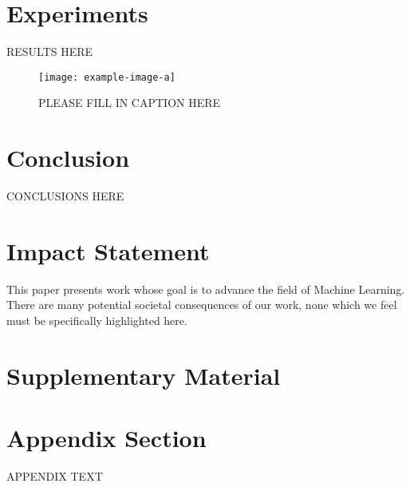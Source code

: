 \documentclass{article}
\theoremstyle{plain}
\theoremstyle{definition}
\theoremstyle{remark}
\begin{document}
\section{Experiments}
\label{sec:experiments}
RESULTS HERE

\begin{figure}[t]
\centering
\texttt{[image: example-image-a]}
\caption{PLEASE FILL IN CAPTION HERE}
\label{fig:first_figure}
\end{figure}

\section{Conclusion}
\label{sec:conclusion}
CONCLUSIONS HERE


\section*{Impact Statement}
This paper presents work whose goal is to advance the field of 
Machine Learning. There are many potential societal consequences 
of our work, none which we feel must be specifically highlighted here.





\newpage
\appendix
\onecolumn

\section*{\LARGE Supplementary Material}
\label{sec:appendix}

\section{Appendix Section}
APPENDIX TEXT
\end{document}
